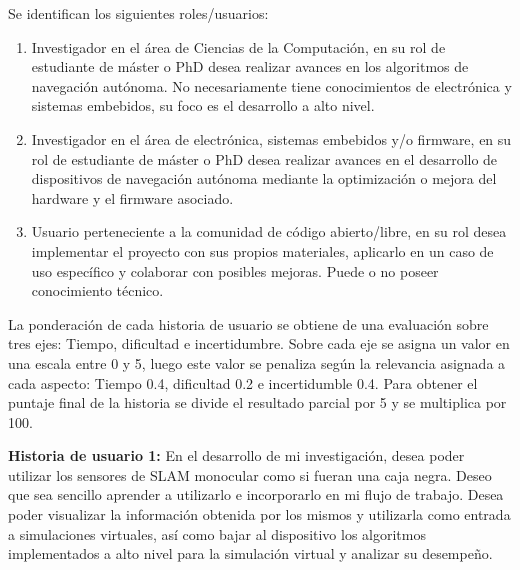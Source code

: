 \documentclass[
11pt, %
codirector, %
]{charter}
\begin{document}



Se identifican los siguientes roles/usuarios:
\begin{enumerate}
	\item Investigador en el área de Ciencias de la Computación, en su rol de estudiante de máster o PhD desea realizar avances en los algoritmos de navegación autónoma. No necesariamente tiene conocimientos de electrónica y sistemas embebidos, su foco es el desarrollo a alto nivel.
	\item Investigador en el área de electrónica, sistemas embebidos y/o firmware, en su rol de estudiante de máster o PhD desea realizar avances en el desarrollo de dispositivos de navegación autónoma mediante la optimización o mejora del hardware y el firmware asociado.
	\item Usuario perteneciente a la comunidad de código abierto/libre, en su rol desea implementar el proyecto con sus propios materiales, aplicarlo en un caso de uso específico y colaborar con posibles mejoras. Puede o no poseer conocimiento técnico.
\end{enumerate}

La ponderación de cada historia de usuario se obtiene de una evaluación sobre tres ejes: Tiempo, dificultad e incertidumbre. Sobre cada eje se asigna un valor en una escala entre 0 y 5, luego este valor se penaliza según la relevancia asignada a cada aspecto: Tiempo 0.4, dificultad 0.2 e incertidumble 0.4. Para obtener el puntaje final de la historia se divide el resultado parcial por 5 y se multiplica por 100.

\textbf{Historia de usuario 1:} En el desarrollo de mi investigación, desea poder utilizar los sensores de SLAM monocular como si fueran una caja negra. Deseo que sea sencillo aprender a utilizarlo e incorporarlo en mi flujo de trabajo. Desea poder visualizar la información obtenida por los mismos y utilizarla como entrada a simulaciones virtuales, así como bajar al dispositivo los algoritmos implementados a alto nivel para la simulación virtual y analizar su desempeño.
\end{document}
